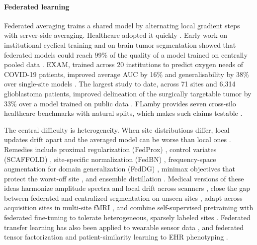 \documentclass[acmsmall,screen,review]{acmart}
\theoremstyle{acmdefinition}
\begin{document}
\paragraph{Federated learning} Federated averaging \cite{mcmahan2017communication} trains a shared model by alternating local gradient steps with server-side averaging. Healthcare adopted it quickly \cite{kaissis2020secure,nguyen2022federated,rieke2020future,xu2021federated}. Early work on institutional cyclical  training \cite{chang2018distributed} and on brain tumor segmentation showed that federated models could reach 99\% of the quality of a model trained on centrally pooled data \cite{sheller2020federated}. EXAM, trained across 20 institutions to predict oxygen needs of COVID-19 patients, improved average AUC by 16\% and generalisability by 38\% over single-site models \cite{dayan2021federated}. The largest study to date, across 71 sites and 6,314 glioblastoma patients, improved delineation of the surgically targetable tumor by 33\% over a model trained on public data \cite{pati2022federated}. FLamby provides seven cross-silo healthcare benchmarks with natural splits, which makes such claims testable \cite{ogierduterrail2022flamby}.

The central difficulty is heterogeneity. When site distributions differ, local updates drift apart and the averaged model can be worse than local ones \cite{hsieh2020non,zhao2018federated}. Remedies include proximal regularization (FedProx) \cite{li2020federated}, control variates (SCAFFOLD) \cite{karimireddy2020scaffold}, site-specific normalization (FedBN) \cite{li2021fedbn}, frequency-space augmentation for domain generalization (FedDG) \cite{liu2021feddg}, minimax objectives that protect the worst-off site \cite{mohri2019agnostic}, and ensemble distillation \cite{lin2020ensemble}. Medical versions of these ideas harmonize amplitude spectra and local drift across scanners \cite{jiang2022harmofl}, close the gap between federated and centralized segmentation on unseen sites \cite{xu2022closing}, adapt across acquisition sites in multi-site fMRI \cite{li2020multi}, and combine self-supervised pretraining with federated fine-tuning to tolerate heterogeneous, sparsely labeled sites \cite{yan2023label}. Federated transfer learning has also been applied to wearable sensor data \cite{chen2020fedhealth}, and federated tensor factorization and patient-similarity learning to EHR phenotyping \cite{kim2017federated,lee2018privacy}.
\end{document}
